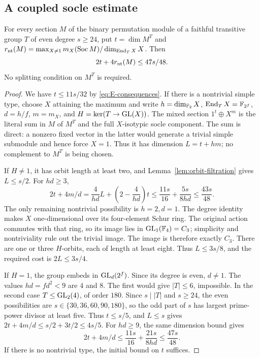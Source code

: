 \subsection{A coupled socle estimate}
\begin{proposition}\label{prop:coupled}
For every section $M$ of the binary permutation module of a faithful
transitive group $T$ of even degree $s\geq24$, put
$t=\dim M^T$ and
$r_{\rm nt}(M)=\max_{X\ne1}m_X(\operatorname{Soc} M)/\dim_{\operatorname{End}_TX}X$.
Then
\begin{equation}\label{eq:coupled}
 2t+4r_{\rm nt}(M)\leq47s/48.
\end{equation}
No splitting condition on $M^T$ is required.
\end{proposition}
\begin{proof}
We have $t\leq11s/32$ by \eqref{eq:E-consequences}. If there is a
nontrivial simple type, choose $X$ attaining the maximum and write
$h=\dim_{\mathbb F_2}X$, $\operatorname{End}_TX=\mathbb F_{2^f}$, $d=h/f$, $m=m_X$,
and $H=\ker(T\to\operatorname{GL}(X))$. The mixed section $1^t\oplus X^m$
is the literal sum in $M$ of $M^T$ and the full $X$-isotypic socle
component.  The sum is direct: a nonzero fixed vector in the latter
would generate a trivial simple submodule and hence force $X=1$.
Thus it has dimension $L=t+hm$; no complement to $M^T$ is being chosen.

If $H\ne1$, it has orbit length at least two, and
Lemma~\ref{lem:orbit-filtration} gives $L\leq s/2$.
For $hd\geq3$,
\[
 2t+4m/d=\frac4{hd}L+\left(2-\frac4{hd}\right)t
 \leq\frac{11s}{16}+\frac{5s}{8hd}\leq\frac{43s}{48}.
\]
The only remaining nontrivial possibility is $h=2,d=1$.
The degree identity makes $X$ one-dimensional over its four-element
Schur ring.  The original action commutes with that ring, so its image
lies in $\operatorname{GL}_1(\mathbb F_4)=C_3$; simplicity and nontriviality rule out the
trivial image.  The image is therefore exactly $C_3$.
There are one or three $H$-orbits, each of length at least eight.
Thus $L\leq3s/8$, and the required cost is $2L\leq3s/4$.

If $H=1$, the group embeds in $\operatorname{GL}_d(2^f)$. Since its degree is
even, $d\ne1$. The values $hd=fd^2<9$ are $4$ and $8$.
The first would give $|T|\leq6$, impossible. In the second case
$T\leq\operatorname{GL}_2(4)$, of order $180$. Since $s\mid |T|$ and $s\geq24$,
the even possibilities are $s\in\{30,36,60,90,180\}$, so the odd part
of $s$ has largest prime-power divisor at least five.
Thus $t\leq s/5$, and $L\leq s$ gives
$2t+4m/d\leq s/2+3t/2\leq4s/5$.
For $hd\geq9$, the same dimension bound gives
\[
 2t+4m/d\leq\frac{11s}{16}+\frac{21s}{8hd}
 \leq\frac{47s}{48}.
\]
If there is no nontrivial type, the initial bound on $t$ suffices.
\end{proof}

